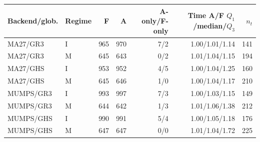 \begin{tabular}{@{}llrrrrr@{}}
\toprule
Backend/glob. & Regime & F & A & A-only/F-only & \shortstack{Time A/F\\$Q_1$/median/$Q_3$} & $n_t$\\
\midrule
MA27/GR3 & I & 965 & 970 & 7/2 & 1.00/1.01/1.14 & 141\\
MA27/GR3 & M & 645 & 643 & 0/2 & 1.01/1.04/1.15 & 194\\
MA27/GHS & I & 953 & 952 & 4/5 & 1.00/1.04/1.25 & 160\\
MA27/GHS & M & 645 & 646 & 1/0 & 1.00/1.04/1.17 & 210\\
MUMPS/GR3 & I & 993 & 997 & 7/3 & 1.00/1.03/1.15 & 149\\
MUMPS/GR3 & M & 644 & 642 & 1/3 & 1.01/1.06/1.38 & 212\\
MUMPS/GHS & I & 990 & 991 & 5/4 & 1.00/1.05/1.18 & 176\\
MUMPS/GHS & M & 647 & 647 & 0/0 & 1.01/1.04/1.72 & 225\\
\bottomrule
\end{tabular}
